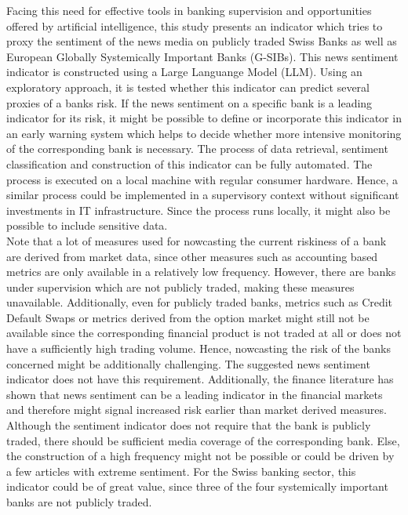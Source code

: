 Facing this need for effective tools in banking supervision and opportunities offered by artificial intelligence, this study presents an indicator which tries to proxy the sentiment of the news media on publicly traded Swiss Banks as well as European Globally Systemically Important Banks (G-SIBs). This news sentiment indicator is constructed using a Large Languange Model (LLM). Using an exploratory approach, it is tested whether this indicator can predict several proxies of a banks risk. If the news sentiment on a specific bank is a leading indicator for its risk, it might be possible to define or incorporate this indicator in an early warning system which helps to decide whether more intensive monitoring of the corresponding bank is necessary. The process of data retrieval, sentiment classification and construction of this indicator can be fully automated. The process is executed on a local machine with regular consumer hardware. Hence, a similar process could be implemented in a supervisory context without significant investments in IT infrastructure. Since the process runs locally, it might also be possible to include sensitive data. \\

Note that a lot of measures used for nowcasting the current riskiness of a bank are derived from market data, since other measures such as accounting based metrics are only available in a relatively low frequency. However, there are banks under supervision which are not publicly traded, making these measures unavailable. Additionally, even for publicly traded banks, metrics such as Credit Default Swaps or metrics derived from the option market might still not be available since the corresponding financial product is not traded at all or does not have a sufficiently high trading volume. Hence, nowcasting the risk of the banks concerned might be additionally challenging. The suggested news sentiment indicator does not have this requirement. Additionally, the finance literature has shown that news sentiment can be a leading indicator in the financial markets and therefore might signal increased risk earlier than market derived measures. Although the sentiment indicator does not require that the bank is publicly traded, there should be sufficient media coverage of the corresponding bank. Else, the construction of a high frequency might not be possible or could be driven by a few articles with extreme sentiment. For the Swiss banking sector, this indicator could be of great value, since three of the four systemically important banks are not publicly traded.



\cleardoublepage
